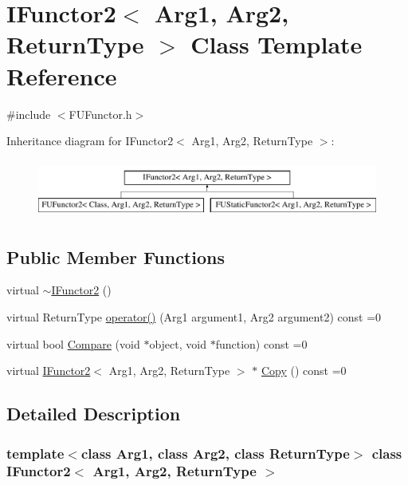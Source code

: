 \hypertarget{classIFunctor2}{
\section{IFunctor2$<$ Arg1, Arg2, ReturnType $>$ Class Template Reference}
\label{classIFunctor2}
}


{\ttfamily \#include $<$FUFunctor.h$>$}

Inheritance diagram for IFunctor2$<$ Arg1, Arg2, ReturnType $>$:\begin{figure}[H]
\begin{center}
\leavevmode
\includegraphics[height=1.931034cm]{classIFunctor2}
\end{center}
\end{figure}
\subsection*{Public Member Functions}
\begin{DoxyCompactItemize}
\item 
virtual \hyperlink{classIFunctor2_a7e55e2e42ffa6dc16c5898e588462ced}{$\sim$IFunctor2} ()
\item 
virtual ReturnType \hyperlink{classIFunctor2_a554589a266d33f262c610b7f40e34f2e}{operator()} (Arg1 argument1, Arg2 argument2) const =0
\item 
virtual bool \hyperlink{classIFunctor2_a99f79daf014f6a713da9798fbee3959f}{Compare} (void $\ast$object, void $\ast$function) const =0
\item 
virtual \hyperlink{classIFunctor2}{IFunctor2}$<$ Arg1, Arg2, ReturnType $>$ $\ast$ \hyperlink{classIFunctor2_a36868826ad8fc518546d04a0a01ffcfc}{Copy} () const =0
\end{DoxyCompactItemize}


\subsection{Detailed Description}
\subsubsection*{template$<$class Arg1, class Arg2, class ReturnType$>$ class IFunctor2$<$ Arg1, Arg2, ReturnType $>$}

